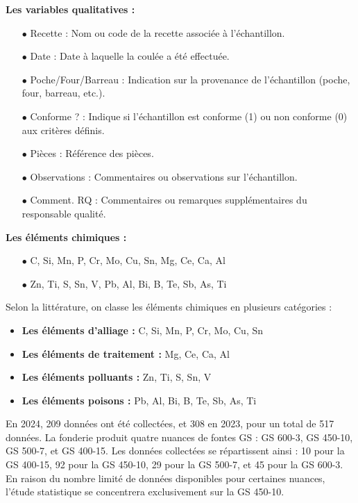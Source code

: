 \documentclass[12pt]{article}
\begin{document}
\vspace{0.5cm}

\textbf{Les variables qualitatives :}

\begin{itemize}
\item[$\bullet$] Recette : Nom ou code de la recette associée à l'échantillon.
\item[$\bullet$] Date : Date à laquelle la coulée a été effectuée.
\item[$\bullet$] Poche/Four/Barreau : Indication sur la provenance de l'échantillon (poche, four, barreau, etc.).
\item[$\bullet$] Conforme ? : Indique si l'échantillon est conforme (1) ou non conforme (0) aux critères définis.
\item[$\bullet$] Pièces : Référence des pièces.
\item[$\bullet$] Observations : Commentaires ou observations sur l'échantillon.
\item[$\bullet$] Comment. RQ : Commentaires ou remarques supplémentaires du responsable qualité.
\end{itemize}

\vspace{0.5cm}

\textbf{Les éléments chimiques :}

\begin{itemize}
\item[$\bullet$] C, Si, Mn, P, Cr, Mo, Cu, Sn, Mg, Ce, Ca, Al 
\item[$\bullet$] Zn, Ti, S, Sn, V, Pb, Al, Bi, B, Te, Sb, As, Ti 
\end{itemize}


Selon la littérature, on classe les éléments chimiques en plusieurs catégories :
\begin{itemize}
    \item \textbf{Les éléments d'alliage :}  C, Si, Mn, P, Cr, Mo, Cu, Sn 
    \item \textbf{Les éléments de traitement :} Mg, Ce, Ca, Al
    \item \textbf{Les éléments polluants :}  Zn, Ti, S, Sn, V 
    \item \textbf{Les éléments poisons :}  Pb, Al, Bi, B, Te, Sb, As, Ti
\end{itemize}




En 2024, 209 données ont été collectées, et 308 en 2023, pour un total de 
517 données. La fonderie produit quatre nuances de fontes GS : GS 600-3, 
GS 450-10, GS 500-7, et GS 400-15. Les données collectées se répartissent 
ainsi : 10 pour la GS 400-15, 92 pour la GS 450-10, 29 pour la GS 500-7, 
et 45 pour la GS 600-3. En raison du nombre limité de données disponibles 
pour certaines nuances, l'étude statistique se concentrera exclusivement 
sur la GS 450-10.
\end{document}

